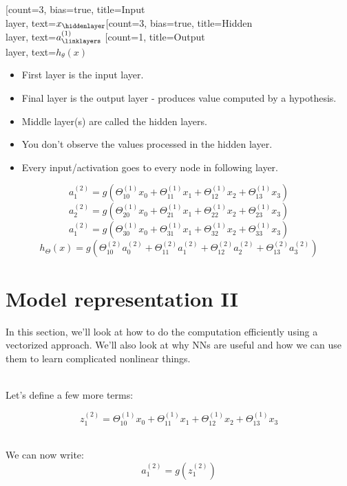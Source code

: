 \documentclass{article}
\begin{document}
\begin{neuralnetwork}[height=4]
  \newcommand{\x}[2]{$x_#2$}
  \newcommand{\h}[2]{\small $a^{(1)}_#2$}
  \newcommand{\y}[2]{$h_{\theta}(x)$}
  [count=3, bias=true, title=Input\\layer, text=\x]
  \hiddenlayer[count=3, bias=true, title=Hidden\\layer, text=\h] \linklayers
  \outputlayer[count=1, title=Output\\layer, text=\y] \linklayers
\end{neuralnetwork}

\begin{itemize}
  \item First layer is the input layer.
  \item Final layer is the output layer - produces value computed by a hypothesis.
  \item Middle layer(s) are called the hidden layers.
  \item You don't observe the values processed in the hidden layer.
  \item Every input/activation goes to every node in following layer.
\end{itemize}

$$a^{(2)}_1 = g(\Theta^{(1)}_{10}x_0+\Theta^{(1)}_{11}x_1+\Theta^{(1)}_{12}x_2+\Theta^{(1)}_{13}x_3)$$
$$a^{(2)}_2 = g(\Theta^{(1)}_{20}x_0+\Theta^{(1)}_{21}x_1+\Theta^{(1)}_{22}x_2+\Theta^{(1)}_{23}x_3)$$
$$a^{(2)}_1 = g(\Theta^{(1)}_{30}x_0+\Theta^{(1)}_{31}x_1+\Theta^{(1)}_{32}x_2+\Theta^{(1)}_{33}x_3)$$
$$h_{\Theta}(x) = g(\Theta^{(2)}_{10}a^{(2)}_0+\Theta^{(2)}_{11}a^{(2)}_1+\Theta^{(2)}_{12}a^{(2)}_2+\Theta^{(2)}_{13}a^{(2)}_3)$$

\section*{Model representation II}
In this section, we'll look at how to do the computation efficiently using a vectorized approach. We'll also look at why NNs are useful and how we can use them to learn complicated nonlinear things.

~\\
Let's define a few more terms:

$$z^{(2)}_1 = \Theta^{(1)}_{10}x_0+\Theta^{(1)}_{11}x_1+\Theta^{(1)}_{12}x_2+\Theta^{(1)}_{13}x_3$$

~\\
We can now write:
$$a^{(2)}_1 = g(z^{(2)}_1)$$
\end{document}
